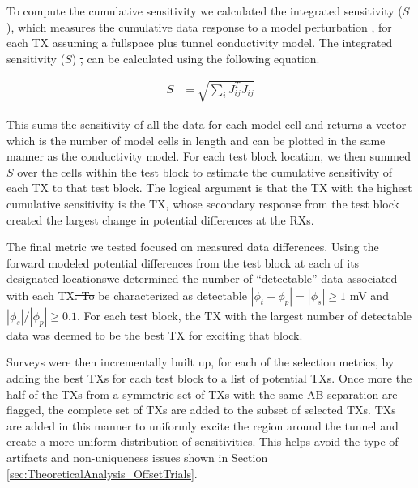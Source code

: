 \documentclass[preprint,authoryear,12pt]{elsarticle}
\providecommand{\DIFaddtex}[1]{{\protect\color{blue}\uwave{#1}}} %
\providecommand{\DIFdeltex}[1]{{\protect\color{red}\sout{#1}}}                      %
\providecommand{\DIFaddbegin}{} %
\providecommand{\DIFaddend}{} %
\providecommand{\DIFdelbegin}{} %
\providecommand{\DIFdelend}{} %
\providecommand{\DIFadd}[1]{\texorpdfstring{\DIFaddtex{#1}}{#1}} %
\providecommand{\DIFdel}[1]{\texorpdfstring{\DIFdeltex{#1}}{}} %
\begin{document}
To compute the cumulative sensitivity we calculated the integrated sensitivity ($S$), which measures the cumulative data response to a model perturbation \citep{Kaputerko2007}, for each TX assuming a fullspace plus tunnel conductivity model. The integrated sensitivity ($S$) \DIFdelbegin \DIFdel{, }\DIFdelend can be calculated using the following equation.

\begin{align}
   S & = \sqrt{\sum_{i} J_{ij}^{T} J_{ij}}
\label{eqn:IntegratedSens}
\end{align}

This \DIFaddbegin \DIFadd{equation }\DIFaddend sums the sensitivity of all the data for each model cell and returns a vector which is the number of model cells in length and can be plotted in the same manner as the conductivity model. For each test block location, we then summed $S$ over the cells within the test block to estimate the cumulative sensitivity of each TX to that test block. The logical argument is that the TX with the highest cumulative sensitivity is the TX, whose secondary response from the test block created the largest change in potential differences at the RXs.

The final metric we tested focused on measured data differences. Using the forward modeled potential differences from the test block at each of its designated locations\DIFaddbegin \DIFadd{, }\DIFaddend we determined the number of ``detectable'' data associated with each TX\DIFdelbegin \DIFdel{. To }\DIFdelend \DIFaddbegin \DIFadd{, to }\DIFaddend be characterized as detectable $|\phi_t - \phi_p| = |\phi_s| \geq 1$ mV and  $|\phi_s|/|\phi_p| \geq 0.1$. For each test block, the TX with the largest number of detectable data was deemed to be the best TX for exciting that block.

Surveys were then incrementally built up, for each of the selection metrics, by adding the best TXs for each test block to a list of potential TXs. Once more the half of the TXs from a symmetric set of TXs with the same AB separation are flagged, the complete set of TXs are added to the subset of selected TXs. TXs are added in this manner to uniformly excite the region around the tunnel and create a more uniform distribution of sensitivities. This helps avoid the type of artifacts and non-uniqueness issues shown in Section \ref{sec:TheoreticalAnalysis_OffsetTrials}.
\end{document}
